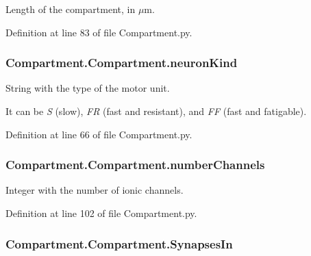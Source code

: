 Length of the compartment, in $\mu$m. 



Definition at line 83 of file Compartment.\-py.

\hypertarget{class_compartment_1_1_compartment_ad42f32769afd94d1e7d7d54008efb6fa}{
\subsubsection[{neuron\-Kind}]{\setlength{\rightskip}{0pt plus 5cm}Compartment.\-Compartment.\-neuron\-Kind}}\label{class_compartment_1_1_compartment_ad42f32769afd94d1e7d7d54008efb6fa}


String with the type of the motor unit. 

It can be {\itshape S} (slow), {\itshape F\-R} (fast and resistant), and {\itshape F\-F} (fast and fatigable). 

Definition at line 66 of file Compartment.\-py.

\hypertarget{class_compartment_1_1_compartment_a0fa96147f76e7814f30610027ed425df}{
\subsubsection[{number\-Channels}]{\setlength{\rightskip}{0pt plus 5cm}Compartment.\-Compartment.\-number\-Channels}}\label{class_compartment_1_1_compartment_a0fa96147f76e7814f30610027ed425df}


Integer with the number of ionic channels. 



Definition at line 102 of file Compartment.\-py.

\hypertarget{class_compartment_1_1_compartment_abe41aff3bffed80f4b848bd14763d506}{
\subsubsection[{Synapses\-In}]{\setlength{\rightskip}{0pt plus 5cm}Compartment.\-Compartment.\-Synapses\-In}}\label{class_compartment_1_1_compartment_abe41aff3bffed80f4b848bd14763d506}


